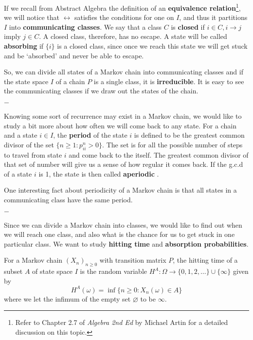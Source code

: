 \documentclass[11pt, a4paper, oneside]{book}
\theoremstyle{definition}
\def\lra{\leftrightarrow}
\newcommand{\breaking}{%
    \begin{center}
    $-$
    \end{center}%
}
\begin{document}
\noindent If we recall from Abstract Algebra the definition of an \textbf{equivalence relation}\footnote{Refer to Chapter 2.7 of \emph{Algebra 2nd Ed} by Michael Artin for a detailed discussion on this topic.}, we will notice that $\lra$ satisfies the conditions for one on $I$, and thus it partitions $I$ into \textbf{communicating classes}. We say that a class $C$ is \textbf{closed} if $i \in C, i \to j$ imply $j \in C$. A closed class, therefore, has no escape. A state will be called \textbf{absorbing} if $\{ i \}$ is a closed class, since once we reach this state we will get stuck and be `absorbed' and never be able to escape. 

\noindent So, we can divide all states of a Markov chain into communicating classes and if the state space $I$ of a chain $P$ is a single class, it is \textbf{irreducible}. It is easy to see the communicating classes if we draw out the states of the chain. 

\breaking

\noindent Knowing some sort of recurrence may exist in a Markov chain, we would like to study a bit more about how often we will come back to any state. For a chain and a state $i \in I$, the \textbf{period} of the state $i$ is defined to be the greatest common divisor of the set $\{ n \ge 1 : p_{ii}^{n} > 0\}$. The set is for all the possible number of steps to travel from state $i$ and come back to the itself. The greatest common divisor of that set of number will give us a sense of how regular it comes back. If the g.c.d of a state $i$ is 1, the state is then called \textbf{aperiodic}
.

\noindent One interesting fact about periodicity of a Markov chain is that all states in a communicating class have the same period. 

\breaking

\noindent Since we can divide a Markov chain into classes, we would like to find out when we will reach one class, and also what is the chance for us to get stuck in one particular class. We want to study \textbf{hitting time} and \textbf{absorption probabilities}. 

\noindent For a Markov chain $(X_n)_{n \ge 0}$ with transition matrix $P$, the hitting time of a subset $A$ of state space $I$ is the random variable $H^A : \Omega \to \{ 0,1,2, \dots\} \cup \{ \infty \}$ given by \[
H^A(\omega) = \inf\{n \ge 0: X_n(\omega) \in A\}
\]
where we let the infimum of the empty set $\varnothing$ to be $\infty$.
\end{document}
